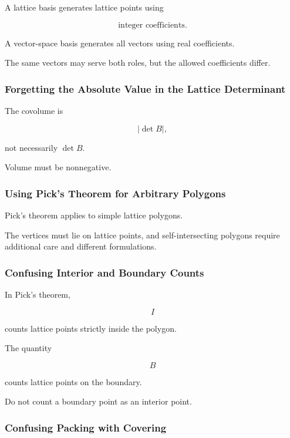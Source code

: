 A lattice basis generates lattice points using

\[
\boxed{
\text{integer coefficients}.
}
\]

A vector-space basis generates all vectors using real coefficients.

The same vectors may serve both roles, but the allowed coefficients differ.

\subsubsection{Forgetting the Absolute Value in the Lattice Determinant}

The covolume is

\[
\boxed{
|\det B|,
}
\]

not necessarily \(\det B\).

Volume must be nonnegative.

\subsubsection{Using Pick's Theorem for Arbitrary Polygons}

Pick's theorem applies to simple lattice polygons.

The vertices must lie on lattice points, and self-intersecting polygons
require additional care and different formulations.

\subsubsection{Confusing Interior and Boundary Counts}

In Pick's theorem,

\[
I
\]

counts lattice points strictly inside the polygon.

The quantity

\[
B
\]

counts lattice points on the boundary.

Do not count a boundary point as an interior point.

\subsubsection{Confusing Packing with Covering}


